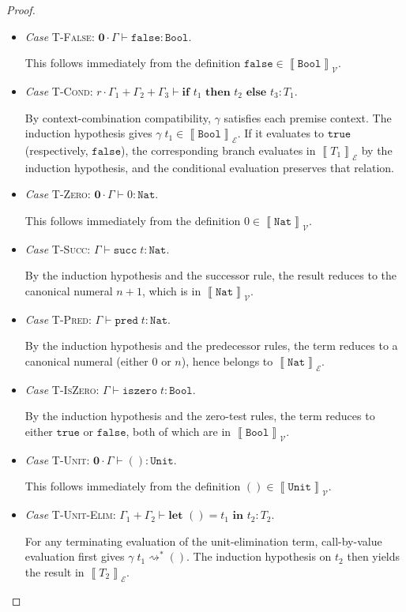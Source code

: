 \documentclass[conference]{IEEEtran}
\newcommand\une[2]{\textbf{let }\unt=#1\textbf{ in }#2}
\newcommand\true{\texttt{true}}
\newcommand\false{\texttt{false}}
\newcommand\bool{\texttt{Bool}}
\newcommand\nat{\texttt{Nat}}
\newcommand\suc[1]{\texttt{succ}\; #1}
\newcommand\prd[1]{\texttt{pred}\; #1}
\newcommand\iszero[1]{\texttt{iszero}\; #1}
\newcommand\unt{()}
\newcommand\untt{\texttt{Unit}}
\newcommand\cond[3]{\textbf{if }#1\textbf{ then }#2\textbf{ else }#3}
\newcommand\srzero{\textbf{0}}
\newcommand\reduce{\rightsquigarrow}
\newcommand\calv{\mathcal{V}}
\newcommand\cale{\mathcal{E}}
\newcommand\bbrac[1]{\left\llbracket #1\right\rrbracket}
\begin{document}
\begin{proof}
\begin{itemize}
		\item \emph{Case} \textsc{T-False}: $\srzero\cdot\Gamma\vdash\false:\bool$.
		
		This follows immediately from the definition $\false\in\bbrac{\bool}_\calv$.
		
		\item \emph{Case} \textsc{T-Cond}: $r\cdot\Gamma_1+\Gamma_2+\Gamma_3\vdash\cond{t_1}{t_2}{t_3}:T_1$.
		
		By context-combination compatibility, $\gamma$ satisfies each premise context. The induction hypothesis gives $\gamma\;t_1\in\bbrac{\bool}_\cale$. If it evaluates to $\true$ (respectively, $\false$), the corresponding branch evaluates in $\bbrac{T_1}_\cale$ by the induction hypothesis, and the conditional evaluation preserves that relation.
		
		\item \emph{Case} \textsc{T-Zero}: $\srzero\cdot\Gamma\vdash 0:\nat$.
		
		This follows immediately from the definition $0\in\bbrac{\nat}_\calv$.
		
		\item \emph{Case} \textsc{T-Succ}: $\Gamma\vdash\suc{t}:\nat$.
		
		By the induction hypothesis and the successor rule, the result reduces to the canonical numeral $n+1$, which is in $\bbrac{\nat}_\calv$.
		
		\item \emph{Case} \textsc{T-Pred}: $\Gamma\vdash\prd{t}:\nat$.
		
		By the induction hypothesis and the predecessor rules, the term reduces to a canonical numeral (either $0$ or $n$), hence belongs to $\bbrac{\nat}_\cale$.
		
		\item \emph{Case} \textsc{T-IsZero}: $\Gamma\vdash\iszero{t}:\bool$.
		
		By the induction hypothesis and the zero-test rules, the term reduces to either $\true$ or $\false$, both of which are in $\bbrac{\bool}_\calv$.
		
		\item \emph{Case} \textsc{T-Unit}: $\srzero\cdot\Gamma\vdash\unt:\untt$.
		
		This follows immediately from the definition $\unt\in\bbrac{\untt}_\calv$.
		
		\item \emph{Case} \textsc{T-Unit-Elim}: $\Gamma_1+\Gamma_2\vdash\une{t_1}{t_2}:T_2$.
		
		For any terminating evaluation of the unit-elimination term, call-by-value evaluation first gives $\gamma\;t_1\reduce^*\unt$. The induction hypothesis on $t_2$ then yields the result in $\bbrac{T_2}_\cale$.
	\end{itemize}
\end{proof}
\end{document}
